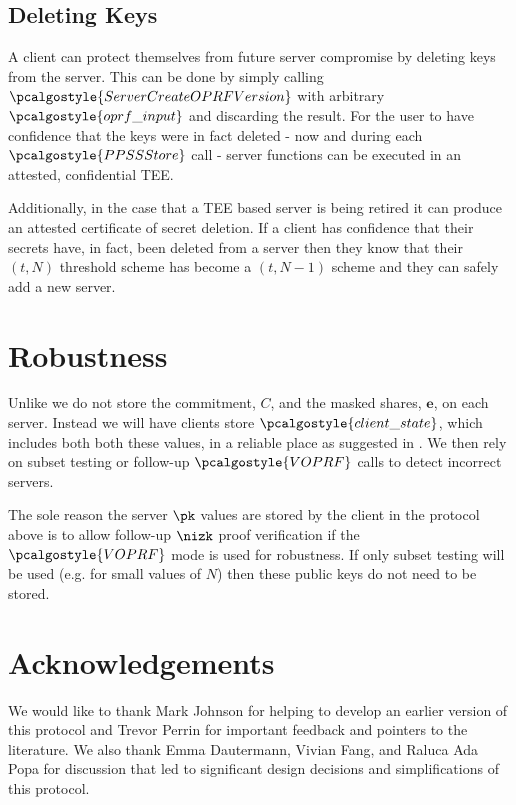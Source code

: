 \documentclass{article}
\newcommand{\VOPRF}{\pcalgostyle{VOPRF}}
\newcommand{\PPSSStore}{\pcalgostyle{PPSSStore}}
\newcommand{\ServerCreateOPRFVersion}{\pcalgostyle{ServerCreateOPRFVersion}}
\newcommand{\oprfinput}{\pcalgostyle{oprf\_input}}
\newcommand{\clientstate}{\pcalgostyle{client\_state}}
\begin{document}
\subsection{Deleting Keys}
\label{sec:deleting}
A client can protect themselves from future server compromise by deleting keys
from the server. This can be done by simply calling $\ServerCreateOPRFVersion$
with arbitrary $\oprfinput$ and discarding the result. For the user to have
confidence that the keys were in fact deleted - now and during each $\PPSSStore$
call - server functions can be executed in an attested, confidential TEE.

Additionally, in the case that a TEE based server is being retired it can
produce an attested certificate of secret deletion.  If a client has confidence
that their secrets have, in fact, been deleted from a server then they know that
their $(t,N)$ threshold scheme has become a $(t,N-1)$ scheme and they can safely
add a new server.

\section{Robustness}
\label{sec:robustness}
Unlike \cite{jkkx} we do not store the commitment, $C$, and the masked shares, 
$\mathbf{e}$, on each server. Instead we will have clients store $\clientstate$,
which includes both both these values, in a reliable place as suggested in \cite{2hashdh}.
We then rely on subset testing or follow-up $\VOPRF$ calls to
detect incorrect servers.

The sole reason the server $\pk$ values are stored by the client in the protocol
above is to allow follow-up $\nizk$ proof verification if the $\VOPRF$ mode
is used for robustness. If only subset testing will be used (e.g. for small 
values of $N$) then these public keys do not need to be stored.

\section{Acknowledgements}  
We would like to thank Mark Johnson for helping to develop an earlier version of
this protocol and Trevor Perrin for important feedback and pointers to the
literature. We also thank Emma Dautermann, Vivian Fang, and Raluca Ada Popa for
discussion that led to significant design decisions and simplifications of this
protocol.



\end{document}
